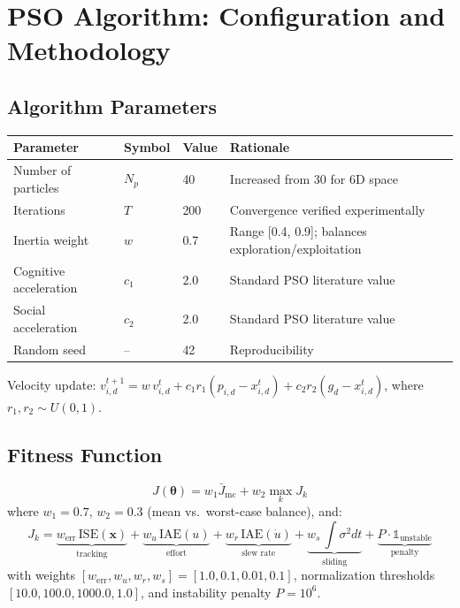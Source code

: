 \documentclass[11pt, a4paper]{article}
\newcommand{\vx}{\boldsymbol{x}}
\begin{document}
\section{PSO Algorithm: Configuration and Methodology}

\subsection{Algorithm Parameters}

\begin{center}
\begin{tabular}{@{}llll@{}}
\toprule
\textbf{Parameter}         & \textbf{Symbol} & \textbf{Value} & \textbf{Rationale} \\
\midrule
Number of particles        & $N_p$           & 40             & Increased from 30 for 6D space \\
Iterations                 & $T$             & 200            & Convergence verified experimentally \\
Inertia weight             & $w$             & 0.7            & Range [0.4, 0.9]; balances exploration/exploitation \\
Cognitive acceleration     & $c_1$           & 2.0            & Standard PSO literature value \\
Social acceleration        & $c_2$           & 2.0            & Standard PSO literature value \\
Random seed                & --              & 42             & Reproducibility \\
\bottomrule
\end{tabular}
\end{center}

Velocity update: $v_{i,d}^{t+1} = w\,v_{i,d}^t
  + c_1 r_1 (p_{i,d} - x_{i,d}^t)
  + c_2 r_2 (g_d - x_{i,d}^t)$,
  where $r_1, r_2 \sim U(0,1)$.

\subsection{Fitness Function}

\begin{equation}
  J(\bm{\theta}) = w_1 \bar{J}_\text{mc}
                 + w_2 \max_k J_k
  \label{eq:pso_cost}
\end{equation}
where $w_1 = 0.7$, $w_2 = 0.3$ (mean vs.\ worst-case balance), and:
\begin{equation}
  J_k = \underbrace{w_\text{err}\,\text{ISE}(\vx)}_{\text{tracking}} +
        \underbrace{w_u\,\text{IAE}(u)}_{\text{effort}} +
        \underbrace{w_r\,\text{IAE}(\dot{u})}_{\text{slew rate}} +
        \underbrace{w_s\,\int\!\sigma^2 dt}_{\text{sliding}} +
        \underbrace{P \cdot \mathbb{1}_\text{unstable}}_{\text{penalty}}
\end{equation}
with weights $[w_\text{err}, w_u, w_r, w_s] = [1.0, 0.1, 0.01, 0.1]$,
normalization thresholds $[10.0, 100.0, 1000.0, 1.0]$,
and instability penalty $P = 10^6$.
\end{document}
